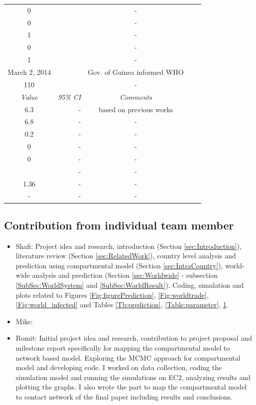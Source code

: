 \documentclass[10pt, journal,onecolumn]{IEEEtran}
\begin{document}
\begin{appendix}
\begin{table}[h]
{\begin{tabular}{@{}crccc@{}}
 0& & -\\
 0& & -\\
 1& & -\\
 0& & -\\
 1& &-\\
 March 2, 2014 &  & Gov. of Guinea informed WHO\\
110 & & -\\
\midrule
 \textit{Value} & \textit{95\% CI} & \textit{Comments} \\
\midrule
6.3 & - & based on previous works \cite{}\\
6.8 & - & -\\
0.2 & - & -\\
0 & - & -\\
0 & - & -\\
 & - & -\\
1.36 &- &-\\
- & - &-\\
\end{tabular}
}
\label{Table:parameter2}
\end{table}


\end{appendix}

\subsection*{Contribution from individual team member}
\begin{itemize}
\item{Shafi: } Project idea and research, introduction (Section \ref{sec:Introduction}), literature review (Section \ref{sec:RelatedWork}), country level analysis and prediction using compartmental model (Section \ref{sec:IntraCountry}), world-wide analysis and prediction (Section \ref{sec:Worldwide} - subsection \ref{SubSec:WorldSystem} and \ref{SubSec:WorldResult}). Coding, simulation and plots related to Figures \ref{Fig:figurePrediction}, \ref{Fig:worldtrade}, \ref{Fig:world_infected} and Tables \ref{Tb:prediction}, \ref{Table:parameter}, \ref{Table:parameter2}.

\item{Mike: } 

\item {Romit: } Initial project idea and research,  contribution to project proposal and milestone report specifically for mapping the compartmental model to network based model. Exploring the MCMC approach for compartmental model  and developing code.
I worked on data collection, coding the simulation model and running the simulations on EC2, analyzing results and plotting the graphs. I also wrote the part to map the compartmental model to contact network of the final  paper including results and conclusions.
\end{itemize}
\end{document}
